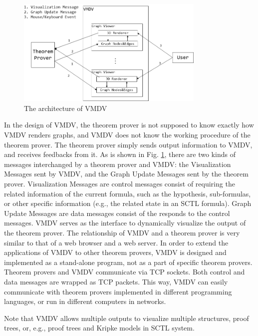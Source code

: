 \documentclass[runningheads]{llncs}
\newcommand\tool[1]{\textsf{#1}}
\newcommand\vmdv{\tool{VMDV}}
\begin{document}
\begin{figure}[!h]
\small
\centering
\includegraphics[width=9cm]{./architecture.png}
\caption{The architecture of \textsf{VMDV}}
\label{fig:architecture}
\end{figure}
In the design of \vmdv{}, the theorem prover is not supposed to know exactly how \vmdv{} renders graphs, and \vmdv{} does not know the working procedure of the theorem prover. The theorem prover simply sends output information to \textsf{VMDV}, and receives feedbacks from it. As is shown in Fig. \ref{fig:architecture}, there are two kinds of messages interchanged by a theorem prover and \vmdv{}: the Visualization Messages sent by \vmdv{}, and the Graph Update Messages sent by the theorem prover. Visualization Messages are control messages consist of requiring the related information of the current formula, such as the hypothesis, sub-formulas, or other specific information (e.g., the related state in an SCTL formula). Graph Update Messages are data messages consist of the responds to the control messages.
\vmdv{} serves as the interface to dynamically visualize the output of the theorem prover. The relationship of \vmdv{} and a theorem prover is very similar to that of a web browser and a web server. In order to extend the applications of \vmdv{} to other theorem provers, \vmdv{} is designed and implemented as a stand-alone program, not as a part of specific theorem provers. Theorem provers and \vmdv{} communicate via TCP sockets. Both control and data messages are wrapped as TCP packets.  This way, \vmdv{} can easily communicate with theorem provers implemented in different programming languages, or run in different computers in networks.
 
Note that \vmdv{} allows multiple outputs to visualize multiple structures, proof trees, or, e.g., proof trees and Kripke models in \textsf{SCTL} system.
 
\end{document}
